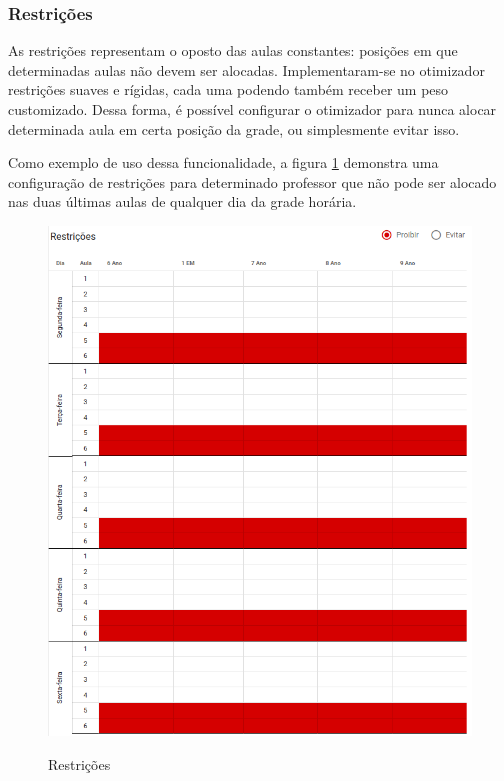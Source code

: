 \subsubsection{Restrições}

As restrições representam o oposto das aulas constantes: posições em que determinadas aulas não devem ser alocadas. Implementaram-se no otimizador restrições suaves e rígidas, cada uma podendo também receber um peso customizado. Dessa forma, é possível configurar o otimizador para nunca alocar determinada aula em certa posição da grade, ou simplesmente evitar isso.

Como exemplo de uso dessa funcionalidade, a figura \ref{fig:restricoes} demonstra uma configuração de restrições para determinado professor que não pode ser alocado nas duas últimas aulas de qualquer dia da grade horária.

\begin{figure}[!htb]
	\centering
	\caption{Restrições}
	\includegraphics[width=1\textwidth]{./dados/figuras/restricoes}
	\label{fig:restricoes}
\end{figure}
\pagebreak


